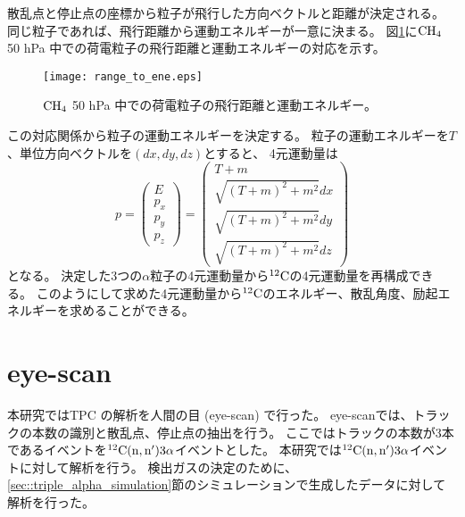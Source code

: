 \documentclass[../master]{subfiles}
\begin{document}
散乱点と停止点の座標から粒子が飛行した方向ベクトルと距離が決定される。
同じ粒子であれば、飛行距離から運動エネルギーが一意に決まる。
図\ref{fig::range_to_ene_alpha}に$\rm CH_{4}$ 50 hPa 中での荷電粒子の飛行距離と運動エネルギーの対応を示す。
\begin{figure}
  \centering
  \texttt{[image: range\_to\_ene.eps]}
  \caption[$\rm CH_{4}$ 50 hPa 中での荷電粒子の飛行距離と運動エネルギー。]
          {$\rm CH_{4}$ 50 hPa 中での荷電粒子の飛行距離と運動エネルギー。
          }
  \label{fig::range_to_ene_alpha}
\end{figure}
この対応関係から粒子の運動エネルギーを決定する。
粒子の運動エネルギーを$T$、単位方向ベクトルを$(dx, dy, dz)$とすると、
4元運動量は
\begin{equation}
  p =
  \begin{pmatrix}
    E \\ p_{x} \\ p_{y} \\ p_{z}
  \end{pmatrix}
  =
  \begin{pmatrix}
    T + m \\ \sqrt{(T+m)^2 + m^2} dx \\ \sqrt{(T+m)^2 + m^2} dy \\ \sqrt{(T+m)^2 + m^2} dz
  \end{pmatrix}
  \label{eq::momentum_vector}
\end{equation}
となる。
決定した3つの$\alpha$粒子の4元運動量から${}^{12}{\rm C}$の4元運動量を再構成できる。
このようにして求めた4元運動量から${}^{12}{\rm C}$のエネルギー、散乱角度、励起エネルギーを求めることができる。


\section{eye-scan}
本研究ではTPC の解析を人間の目 (eye-scan) で行った。
eye-scanでは、トラックの本数の識別と散乱点、停止点の抽出を行う。
ここではトラックの本数が3本であるイベントを${}^{12}{\rm C}({\rm n},{\rm n}')3\alpha$イベントとした。
本研究では${}^{12}{\rm C}({\rm n},{\rm n}')3\alpha$イベントに対して解析を行う。
検出ガスの決定のために、\ref{sec::triple_alpha_simulation}節のシミュレーションで生成したデータに対して解析を行った。
\end{document}
